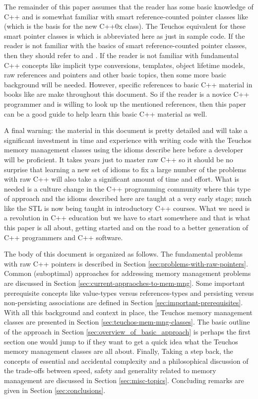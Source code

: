 \documentclass[pdf,ps2pdf,11pt]{SANDreport}
\begin{document}
The remainder of this paper assumes that the reader has some basic knowledge
of C++ and is somewhat familiar with smart reference-counted pointer classes
like {} (which is the basis for the new C++0x
{} class).  The Teuchos equivalent for these smart
pointer classes is {} which is abbreviated here as just
{} in sample code.  If the reader is not familiar with the basics of
smart reference-counted pointer classes, then they should refer to
{}\cite{RefCountPtrBeginnersGuide} and {}\cite{C++CodingStandards05}.  If the
reader is not familiar with fundamental C++ concepts like implicit type
conversions, templates, object lifetime models, raw references and pointers
and other basic topics, then some more basic background will be needed.
However, specific references to basic C++ material in books like
{}\cite{EffectiveC++ThirdEdition, stroustrup97, C++CodingStandards05} are make
throughout this document.  So if the reader is a novice C++ programmer and is
willing to look up the mentioned references, then this paper can be a good
guide to help learn this basic C++ material as well.

A final warning: the material in this document is pretty detailed and will
take a significant investment in time and experience with writing code with
the Teuchos memory management classes using the idioms describe here before a
developer will be proficient.  It takes years just to master raw C++ so it
should be no surprise that learning a new set of idioms to fix a large number
of the problems with raw C++ will also take a significant amount of time and
effort.  What is needed is a culture change in the C++ programming community
where this type of approach and the idioms described here are taught at a very
early stage; much like the STL is now being taught in introductory C++
courses.  What we need is a revolution in C++ education but we have to start
somewhere and that is what this paper is all about, getting started and on the
road to a better generation of C++ programmers and C++ software.

The body of this document is organized as follows. The fundamental problems
with raw C++ pointers is described in Section
{}\ref{sec:problems-with-raw-pointers}.  Common (suboptimal) approaches for
addressing memory management problems are discussed in Section
{}\ref{sec:current-appraoches-to-mem-mng}.  Some important prerequisite
concepts like value-types versus references-types and persisting versus
non-persisting associations are defined in Section
{}\ref{sec:important-prerequisites}.  With all this background and context in
place, the Teuchos memory management classes are presented in Section
{}\ref{sec:teuchos-mem-mng-classes}.  The basic outline of the approach in
Section {}\ref{sec:overview_of_basic_approach} is perhaps the first section
one would jump to if they want to get a quick idea what the Teuchos memory
management classes are all about.  Finally, Taking a step back, the concepts
of essential and accidental complexity and a philosophical discussion of the
trade-offs between speed, safety and generality related to memory management
are discussed in Section {}\ref{sec:misc-topics}.  Concluding remarks are
given in Section {}\ref{sec:conclusions}.
\end{document}
